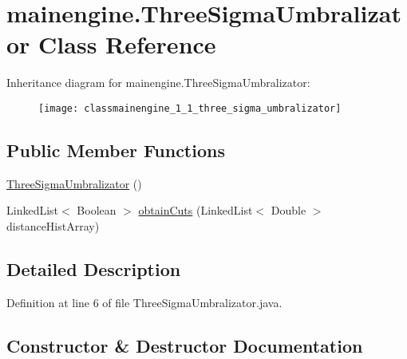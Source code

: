 \hypertarget{classmainengine_1_1_three_sigma_umbralizator}{}\section{mainengine.\+Three\+Sigma\+Umbralizator Class Reference}
\label{classmainengine_1_1_three_sigma_umbralizator}
Inheritance diagram for mainengine.\+Three\+Sigma\+Umbralizator\+:\begin{figure}[H]
\begin{center}
\leavevmode
\texttt{[image: classmainengine\_1\_1\_three\_sigma\_umbralizator]}
\end{center}
\end{figure}
\subsection*{Public Member Functions}
\begin{DoxyCompactItemize}
\item 
\hyperlink{classmainengine_1_1_three_sigma_umbralizator_a6ab404b91b56a67cdf00b43ed260af37}{Three\+Sigma\+Umbralizator} ()
\item 
Linked\+List$<$ Boolean $>$ \hyperlink{classmainengine_1_1_three_sigma_umbralizator_a56bfd8fcc856b38e503273e85c0ccf33}{obtain\+Cuts} (Linked\+List$<$ Double $>$ distance\+Hist\+Array)
\end{DoxyCompactItemize}


\subsection{Detailed Description}


Definition at line 6 of file Three\+Sigma\+Umbralizator.\+java.



\subsection{Constructor \& Destructor Documentation}
\hypertarget{classmainengine_1_1_three_sigma_umbralizator_a6ab404b91b56a67cdf00b43ed260af37}{}\label{classmainengine_1_1_three_sigma_umbralizator_a6ab404b91b56a67cdf00b43ed260af37} 
